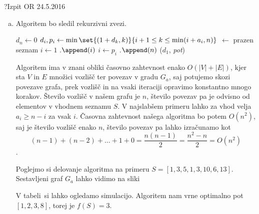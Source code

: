 \begin{naloga}{?}{Izpit OR 24.5.2016}
\begin{odgovor}
\begin{enumerate}[(a)]
\item Algoritem bo sledil rekurzivni zvezi.

\begin{small}
\begin{algorithmic}
	\State $d_n \gets 0$
		\State $d_i, p_i \gets
            \min\set{(1+d_k, k)}{i+1 \le k \le \min(i+a_i, n)}$
	\EndFor
	 $\gets$ prazen seznam
	\State $i \gets 1$
		.$\append(i)$
		\State $i \gets p_i$
	\EndWhile
    .$\append(n)$
	\State \Return ($d_1$, {\sl pot})
\EndFunction
\end{algorithmic}
\end{small}

Algoritem ima v znani obliki časovno zahtevnost enako $O(|V| + |E|)$, kjer sta $V$ in $E$ množici vozlišč ter povezav v gradu $G_a$, 
saj potujemo skozi povezave grafa, prek vozlišč in na vsaki iteraciji opravimo konstantno mnogo korakov.
Število vozlišč v našem grafu je $n$, število povezav pa je odvisno od elementov v vhodnem seznamu $S$.
V najslabšem primeru lahko za vhod velja $a_i \ge n-i$ za vsak $i$.
Časovna zahtevnost našega algoritma bo potem $O(n^2)$,
saj je število vozlišč enako $n$,
število povezav pa lahko izračunamo kot
$$
(n - 1) + (n - 2) + \dots + 1 + 0 = \frac{n (n - 1)}{2}
= \frac{n ^2 - n}{2} = O(n^2)
$$.

Poglejmo si delovanje algoritma na primeru $S = [1,3,5,1,3,10,6,13]$.
Sestavljeni graf $G_a$ lahko vidimo na sliki~\fig

\begin{slika}
\pgfslika
{}
\end{slika}

V tabeli~\tab si lahko ogledamo simulacijo.
Algoritem nam vrne optimalno pot $[1, 2, 3, 8]$, torej je $f(S) = 3$.


\end{enumerate}
\end{odgovor}
\end{naloga}
